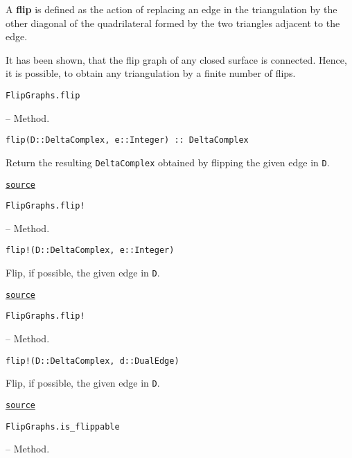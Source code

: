 \label{17856663285825007015}{}


A \textbf{flip} is defined as the action of replacing an edge in the triangulation by the other diagonal of the quadrilateral formed by the two triangles adjacent to the edge.



It has been shown, that the flip graph of any closed surface is connected. Hence, it is possible, to obtain any triangulation by a finite number of flips.


\hypertarget{10138197749309540155}{\texttt{FlipGraphs.flip}}  -- {Method.}

\begin{adjustwidth}{2em}{0pt}


\begin{verbatim}
flip(D::DeltaComplex, e::Integer) :: DeltaComplex
\end{verbatim}

Return the resulting \texttt{DeltaComplex} obtained by flipping the given edge in \texttt{D}.



\href{https://github.com/schto223/FlipGraphs.jl/blob/e35d43698a06b86273148826b79d585ba04fcd26/src/deltaComplex.jl#L860-L864}{\texttt{source}}


\end{adjustwidth}
\hypertarget{18117735675891637030}{\texttt{FlipGraphs.flip!}}  -- {Method.}

\begin{adjustwidth}{2em}{0pt}


\begin{verbatim}
flip!(D::DeltaComplex, e::Integer)
\end{verbatim}

Flip, if possible, the given edge in \texttt{D}.



\href{https://github.com/schto223/FlipGraphs.jl/blob/e35d43698a06b86273148826b79d585ba04fcd26/src/deltaComplex.jl#L871-L875}{\texttt{source}}


\end{adjustwidth}
\hypertarget{5822682659714476017}{\texttt{FlipGraphs.flip!}}  -- {Method.}

\begin{adjustwidth}{2em}{0pt}


\begin{verbatim}
flip!(D::DeltaComplex, d::DualEdge)
\end{verbatim}

Flip, if possible, the given edge in \texttt{D}.



\href{https://github.com/schto223/FlipGraphs.jl/blob/e35d43698a06b86273148826b79d585ba04fcd26/src/deltaComplex.jl#L878-L882}{\texttt{source}}


\end{adjustwidth}
\hypertarget{2770587389040278334}{\texttt{FlipGraphs.is\_flippable}}  -- {Method.}


